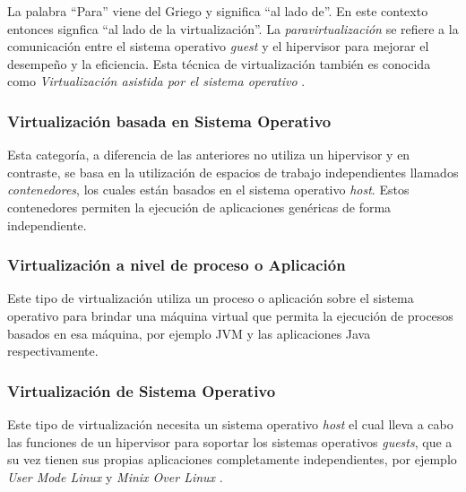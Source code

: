La palabra ``Para'' viene del Griego y significa ``al lado de''. En este contexto entonces signfica ``al lado de la virtualización''. La \textit{paravirtualización} se refiere a la comunicación entre el sistema operativo \textit{guest} y el hipervisor para mejorar el desempeño y la eficiencia. Esta técnica de virtualización también es conocida como \textit{Virtualización asistida por el sistema operativo} \parencite{VMware2008}.



\subsubsection{Virtualización basada en Sistema Operativo}
Esta categoría, a diferencia de las anteriores no utiliza un hipervisor y en contraste, se basa en la utilización de espacios de trabajo independientes llamados \textit{contenedores}, los cuales están basados en el sistema operativo \textit{host}. Estos contenedores permiten la ejecución de aplicaciones genéricas de forma independiente.\\

\subsubsection{Virtualización a nivel de proceso o Aplicación}
Este tipo de virtualización utiliza un proceso  o aplicación sobre el sistema operativo para brindar una máquina virtual que permita la ejecución de procesos basados en esa máquina, por ejemplo JVM y las aplicaciones Java respectivamente. \\ 

\subsubsection{Virtualización de Sistema Operativo}
Este tipo de virtualización necesita un sistema operativo \textit{host} el cual lleva a cabo las funciones de un hipervisor para soportar los sistemas operativos \textit{guests},  que a su vez tienen sus propias aplicaciones completamente independientes, por ejemplo \textit{User Mode Linux} \parencite{Dike2006}  y \textit{Minix Over Linux} \parencite{Pessolani2012}.